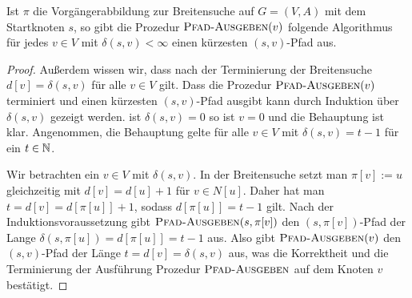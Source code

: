 \begin{prop}
	Ist $\pi$ die Vorgängerabbildung zur Breitensuche auf $G=(V,A)$ mit dem Startknoten $s$, so gibt die Prozedur $\mathop{\text{\textsc{Pfad-Ausgeben}}}(v)$ folgende Algorithmus für jedes $v \in V$ mit $\delta(s,v)<\infty$ einen kürzesten $(s,v)$-Pfad aus. 
\end{prop}
\begin{proof} 
Außerdem wissen wir, dass nach der Terminierung der Breitensuche $d[v]=\delta(s,v)$ für alle $v \in V$ gilt. Dass die Prozedur $\mathop{\text{\textsc{Pfad-Ausgeben}}}(v)$ terminiert und einen kürzesten $(s,v)$-Pfad ausgibt kann durch Induktion über $\delta(s,v)$ gezeigt werden. ist $\delta(s,v)=0$ so ist $v=0$ und die Behauptung ist klar. Angenommen, die Behauptung gelte für alle $v \in V$ mit $\delta(s,v)=t-1$ für ein $t \in \mathbb{N}$. 

Wir betrachten ein $v \in V$ mit $\delta(s,v)$. 	In der Breitensuche setzt man  $\pi[v] := u$ gleichzeitig mit $d[v] = d[u]+1$ für $v \in N[u]$. Daher hat man $t = d[v] = d[\pi[u]] + 1 $, sodass $d[\pi[u]]=t-1$ gilt. Nach der Induktionsvoraussetzung  gibt $\mathop{\text{\textsc{Pfad-Ausgeben}}}(s,\pi[v])$ den $(s,\pi[v])$-Pfad der Lange $\delta(s,\pi[u]) = d[\pi[u]]  = t-1$ aus. Also gibt $\mathop{\text{\textsc{Pfad-Ausgeben}}}(v)$ den $(s,v)$-Pfad der Länge $t = d[v] = \delta(s,v)$ aus, was die Korrektheit und die Terminierung der Ausführung Prozedur $\mathop{\text{\textsc{Pfad-Ausgeben}}}$  auf dem Knoten $v$ bestätigt. 
\end{proof} 



